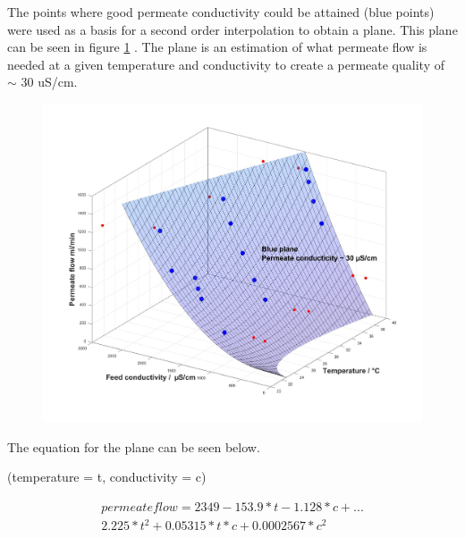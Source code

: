 \newpage

The points where good permeate conductivity could be attained (blue points) were used as a basis for a second order interpolation to obtain a plane. This plane can be seen in figure \ref{fig:FinalResult_3} . The plane is an estimation of what permeate flow is needed at a given temperature and conductivity to create a permeate quality of  $\sim$ 30 uS/cm. 

\begin{figure}[H]
    \centering
    \includegraphics[width=1.1\textwidth]{FinalResult_3}
    \caption{}
    \label{fig:FinalResult_3}
\end{figure}

The equation for the plane can be seen below.

(temperature = t, conductivity = c)

\begin{multline}
 permeate flow =  2349-153.9*t-1.128*c+...\\
2.225*t^2+0.05315*t*c+0.0002567*c^2
\end{multline}

\newpage





